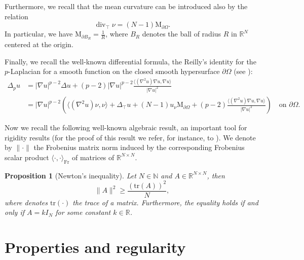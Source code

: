 \documentclass[10pt,a4paper]{amsart}
\numberwithin{equation}{section}
\newcommand{\R}{\mathbb{R}}
\newcommand{\N}{\mathbb{N}}
\newtheorem{prop}[teo]{Proposition}
\renewcommand{\div}{\operatorname{div}}
\begin{document}
Furthermore, we recall that the mean curvature can be introduced also by the relation 
\begin{equation*}
\div_{\top} \nu = (N-1) \mathrm{M}_{\partial\Omega}.    
\end{equation*} 
In particular, we have $\mathrm{M}_{\partial B_R} = \frac{1}{R}$, where $B_R$ denotes the ball of radius $R$ in $\R^N$ centered at the origin.

Finally, we recall the well-known differential formula, the Reilly's identity for the $p$-Laplacian for a smooth function on the closed smooth hypersurface $\partial \Omega$ (see \cite{hepi18}):
\begin{equation}\label{eq: reilly formula}
\begin{split}
    \Delta_p u & = |\nabla u|^{p-2} \Delta u + (p-2) |\nabla u|^{p-2} \frac{\langle(\nabla^2u)\nabla u,\nabla u\rangle}{|\nabla u|^{2}}
    \\
    & = |\nabla u|^{p-2} \left( \langle(\nabla^2u)\nu,\nu\rangle + \Delta_\top u  + (N-1) u_\nu \mathrm{M}_{\partial\Omega} + (p-2)\frac{\langle(\nabla^2u)\nabla u,\nabla u\rangle}{|\nabla u|^{2}} \right) \quad \text{on } \partial\Omega.
\end{split}
\end{equation}


Now we recall the following well-known algebraic result, an important tool for rigidity results (for the proof of this result we refer, for instance, to \cite[Prop. 2.4]{CoFe20}). We denote
by $\|\cdot\|$ the Frobenius matrix norm induced by the corresponding Frobenius scalar product $\langle \cdot , \cdot \rangle_{\mathrm{Fr}}$ of matrices of $\R^{N\times N}$.

\begin{prop}[Newton’s inequality] \label{prop newton}
    Let $N \in \N$ and $A \in \R^{N \times N}$, then 
    \begin{equation*}
        \|A\|^2 \geq \frac{(\mathrm{tr}(A))^2}{N},
    \end{equation*}
    where denotes $\mathrm{tr}(\cdot)$ the trace of a matrix. Furthermore, the equality holds if and only if $A = k I_N$ for some constant $k \in \R$.
\end{prop}




\section{Properties and regularity}\label{sec: properties and regularity}
\end{document}
